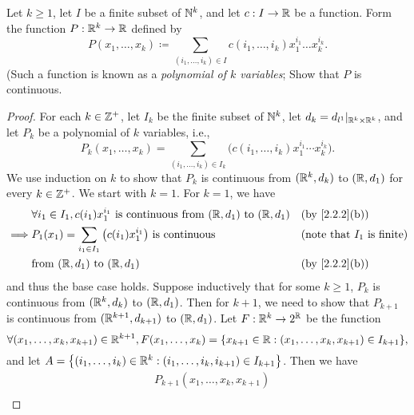 \begin{ex}\label{ex:2.2.7}
  Let \(k \geq 1\), let \(I\) be a finite subset of \(\mathbb{N}^k\), and let \(c : I \to \mathbb{R}\) be a function.
  Form the function \(P : \mathbb{R}^k \to \mathbb{R}\) defined by
  \[
    P(x_1, \dots, x_k) \coloneqq \sum_{(i_1, \dots, i_k) \in I} c(i_1, \dots, i_k) x_1^{i_1} \dots x_k^{i_k}.
  \]
  (Such a function is known as a \emph{polynomial of \(k\) variables};
  Show that \(P\) is continuous.
\end{ex}

\begin{proof}
  For each \(k \in \mathbb{Z}^+\), let \(I_k\) be the finite subset of \(\mathbb{N}^k\), let \(d_k = d_{l^1}|_{\mathbb{R}^k \times \mathbb{R}^k}\), and let \(P_k\) be a polynomial of \(k\) variables, i.e.,
  \[
    P_k(x_1, \dots, x_k) = \sum_{(i_1, \dots, i_k) \in I_k} \big(c(i_1, \dots, i_k) x_1^{i_1} \cdots x_k^{i_k}\big).
  \]
  We use induction on \(k\) to show that \(P_k\) is continuous from \((\mathbb{R}^k, d_k)\) to \((\mathbb{R}, d_1)\) for every \(k \in \mathbb{Z}^+\).
  We start with \(k = 1\).
  For \(k = 1\), we have
  \begin{align*}
             & \forall i_1 \in I_1, c(i_1) x_1^{i_1} \text{ is continuous from } (\R, d_1) \text{ to } (\R, d_1) &  & \text{(by \cref{2.2.2}(b))}          \\
    \implies & P_1(x_1) = \sum_{i_1 \in I_1} \big(c(i_1) x_1^{i_1}\big) \text{ is continuous}                    &  & \text{(note that \(I_1\) is finite)} \\
             & \text{from } (\R, d_1) \text{ to } (\R, d_1)                                                      &  & \text{(by \cref{2.2.2}(b))}
  \end{align*}
  and thus the base case holds.
  Suppose inductively that for some \(k \geq 1\), \(P_k\) is continuous from \((\mathbb{R}^k, d_k)\) to \((\mathbb{R}, d_1)\).
  Then for \(k + 1\), we need to show that \(P_{k + 1}\) is continuous from \((\mathbb{R}^{k + 1}, d_{k + 1})\) to \((\mathbb{R}, d_1)\).
  Let \(F : \mathbb{R}^k \to 2^{\mathbb{R}}\) be the function
  \[
    \forall (x_1, \dots, x_k, x_{k + 1}) \in \R^{k + 1}, F(x_1, \dots, x_k) = \set{x_{k + 1} \in \R : (x_1, \dots, x_k, x_{k + 1}) \in I_{k + 1}},
  \]
  and let \(A = \left\lbrace(i_1, \dots, i_k) \in \mathbb{R}^k : (i_1, \dots, i_k, i_{k + 1}) \in I_{k + 1}\right\rbrace\).
  Then we have
  \begin{align*}
     & P_{k + 1}(x_1, \dots, x_k, x_{k + 1})                                                                                                                                                                        \\

\end{align*}
\end{proof}
